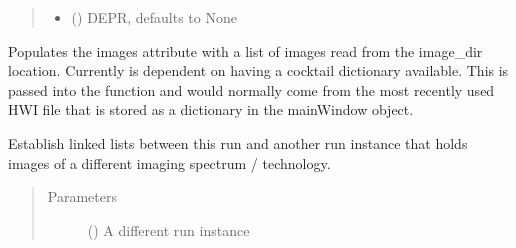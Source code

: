 \documentclass[letterpaper,10pt,english]{sphinxmanual}
\begin{document}
\begin{fulllineitems}
\begin{fulllineitems}
\begin{quote}
\begin{description}
\begin{itemize}
\item {} 
 (\sphinxstyleliteralemphasis{\sphinxupquote{, }}) \textendash{} DEPR, defaults to None

\end{itemize}

\end{description}\end{quote}

\end{fulllineitems}


\begin{fulllineitems}
\label{\detokenize{polo.crystallography:polo.crystallography.run.HWIRun.add_images_from_dir}}
Populates the images attribute with a list of images read from the
image\_dir location. Currently is dependent on having a cocktail
dictionary available. This is passed into the function and would
normally come from the most recently used HWI file that is
stored as a dictionary in the mainWindow object.

\end{fulllineitems}


\begin{fulllineitems}
\label{\detokenize{polo.crystallography:polo.crystallography.run.HWIRun.link_to_alt_images}}
Establish linked lists between this run and another run instance
that holds images of a different imaging spectrum / technology.
\begin{quote}\begin{description}
\item[{Parameters}] \leavevmode
{} ({\hyperref[\detokenize{polo.crystallography:polo.crystallography.run.Run}]{}}) \textendash{} A different run instance


\end{description}
\end{quote}
\end{fulllineitems}
\end{fulllineitems}
\end{document}
